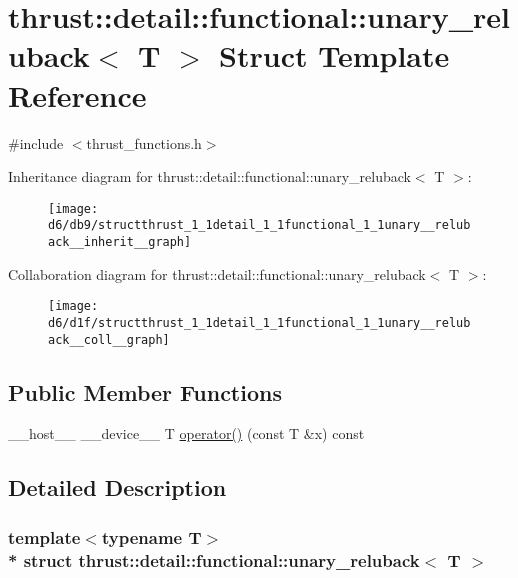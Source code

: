 \hypertarget{structthrust_1_1detail_1_1functional_1_1unary__reluback}{}\section{thrust\+:\+:detail\+:\+:functional\+:\+:unary\+\_\+reluback$<$ T $>$ Struct Template Reference}
\label{structthrust_1_1detail_1_1functional_1_1unary__reluback}


{\ttfamily \#include $<$thrust\+\_\+functions.\+h$>$}



Inheritance diagram for thrust\+:\+:detail\+:\+:functional\+:\+:unary\+\_\+reluback$<$ T $>$\+:
\nopagebreak
\begin{figure}[H]
\begin{center}
\leavevmode
\texttt{[image: d6/db9/structthrust\_1\_1detail\_1\_1functional\_1\_1unary\_\_reluback\_\_inherit\_\_graph]}
\end{center}
\end{figure}


Collaboration diagram for thrust\+:\+:detail\+:\+:functional\+:\+:unary\+\_\+reluback$<$ T $>$\+:
\nopagebreak
\begin{figure}[H]
\begin{center}
\leavevmode
\texttt{[image: d6/d1f/structthrust\_1\_1detail\_1\_1functional\_1\_1unary\_\_reluback\_\_coll\_\_graph]}
\end{center}
\end{figure}
\subsection*{Public Member Functions}
\begin{DoxyCompactItemize}
\item 
\+\_\+\+\_\+host\+\_\+\+\_\+ \+\_\+\+\_\+device\+\_\+\+\_\+ T \hyperlink{structthrust_1_1detail_1_1functional_1_1unary__reluback_aab491540c66d812c1bb2da1711c9e8bc}{operator()} (const T \&x) const 
\end{DoxyCompactItemize}


\subsection{Detailed Description}
\subsubsection*{template$<$typename T$>$\\*
struct thrust\+::detail\+::functional\+::unary\+\_\+reluback$<$ T $>$}



